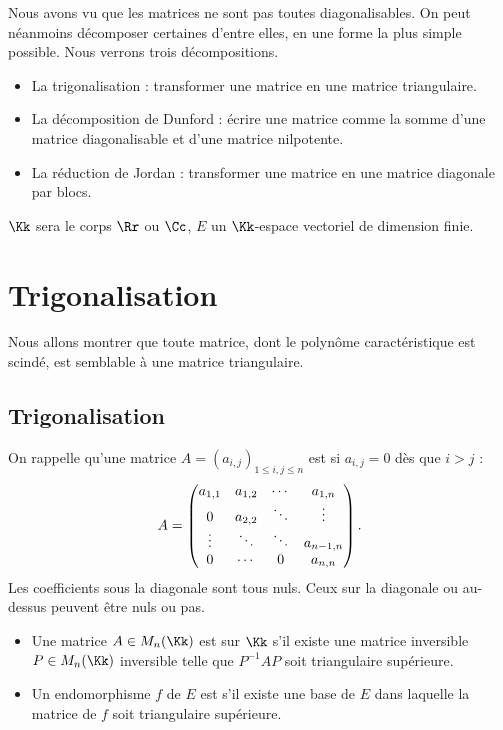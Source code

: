 \documentclass[12pt, class=report,crop=false]{standalone}
\begin{document}


Nous avons vu que les matrices ne sont pas toutes diagonalisables. 
On peut néanmoins décomposer certaines d'entre elles, en une forme la plus simple possible.
Nous verrons trois décompositions. 
\begin{itemize}
  \item La trigonalisation : transformer une matrice en une matrice triangulaire.
  \item La décomposition de Dunford : écrire une matrice comme la somme d'une matrice diagonalisable et d'une matrice nilpotente.
  \item La réduction de Jordan : transformer une matrice en une matrice diagonale par blocs.
\end{itemize}

$\Kk$ sera le corps $\Rr$ ou $\Cc$, $E$ un $\Kk$-espace vectoriel de dimension finie.


\section{Trigonalisation}

Nous allons montrer que toute matrice, dont le polynôme caractéristique est scindé, est semblable à une matrice triangulaire.

\subsection{Trigonalisation}


On rappelle qu'une matrice $A=(a_{i,j})_{1\leq i,j\leq n}$ est  
si $a_{i,j}=0$ dès que $i> j$ :
$$A=\begin{pmatrix}
a_{1,1}&a_{1,2}&\cdots &a_{1,n} \cr 
0&a_{2,2} & \ddots &\vdots \cr
\vdots &\ddots &\ddots& a_{n-1,n}\cr
0&\cdots&0&a_{n,n}
\end{pmatrix}.$$
Les coefficients sous la diagonale sont tous nuls. Ceux sur la diagonale ou au-dessus peuvent être nuls ou pas.

\begin{definition}
\sauteligne
\begin{itemize}
  \item Une matrice $A \in M_n(\Kk)$ est  sur $\Kk$
  s'il existe une matrice inversible $P \in M_n(\Kk)$ inversible telle que $P^{-1}AP$ soit triangulaire supérieure.
  
  \item Un endomorphisme $f$ de $E$ est  s'il existe une
base de $E$ dans laquelle la matrice de $f$ soit triangulaire supérieure.
\end{itemize}
\end{definition} 
\end{document}
